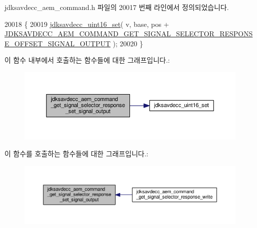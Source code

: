jdksavdecc\+\_\+aem\+\_\+command.\+h 파일의 20017 번째 라인에서 정의되었습니다.


\begin{DoxyCode}
20018 \{
20019     \hyperlink{group__endian_ga14b9eeadc05f94334096c127c955a60b}{jdksavdecc\_uint16\_set}( v, base, pos + 
      \hyperlink{group__command__get__signal__selector__response_ga086c9ac6dbd4d27dd99c50e351f35856}{JDKSAVDECC\_AEM\_COMMAND\_GET\_SIGNAL\_SELECTOR\_RESPONSE\_OFFSET\_SIGNAL\_OUTPUT}
       );
20020 \}
\end{DoxyCode}


이 함수 내부에서 호출하는 함수들에 대한 그래프입니다.\+:
\nopagebreak
\begin{figure}[H]
\begin{center}
\leavevmode
\includegraphics[width=350pt]{group__command__get__signal__selector__response_gaaa138d32719cc3c765c5ccdcdba9b039_cgraph}
\end{center}
\end{figure}




이 함수를 호출하는 함수들에 대한 그래프입니다.\+:
\nopagebreak
\begin{figure}[H]
\begin{center}
\leavevmode
\includegraphics[width=350pt]{group__command__get__signal__selector__response_gaaa138d32719cc3c765c5ccdcdba9b039_icgraph}
\end{center}
\end{figure}


